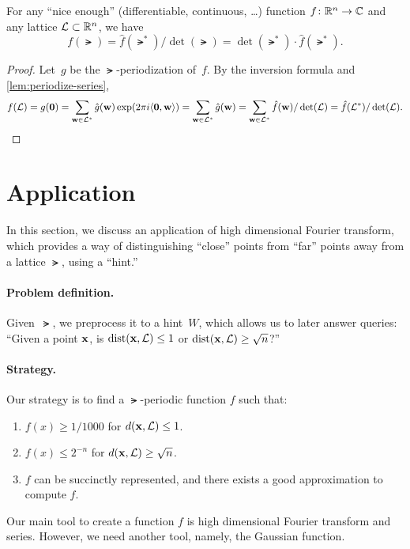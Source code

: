\documentclass[11pt]{article}
\begin{document}
\begin{lemma}
  \label{lem:psf}
  For any ``nice enough'' (differentiable, continuous, \ldots)
  function $f \colon \mathbb{R}^n \to \mathbb{C}$ and any lattice
  $\mathcal{L} \subset \mathbb{R}^{n}$, we have
  \[ f(\lat) = \hat{f}(\lat^{*}) / \det(\lat) = \det(\lat^*) \cdot
    \hat{f}(\lat^*). \]
\end{lemma}

\begin{proof}
  Let~$g$ be the $\lat$-periodization of~$f$. By the inversion formula
  and \cref{lem:periodize-series},
  \[ f(\mathcal{L}) = g(\mathbf{0}) = \sum_{\mathbf{w} \in \mathcal{L}^*}
    \hat{g}(\mathbf{w})\exp(2 \pi i \langle\mathbf{0},\mathbf{w}\rangle) = \sum_{\mathbf{w}
      \in \mathcal{L}^*} \hat{g}(\mathbf{w}) = \sum_{\mathbf{w} \in \mathcal{L}^{*}}
    \hat{f}(\mathbf{w})/\det(\mathcal{L}) = \hat{f}(\mathcal{L}^{*}) / \det(\mathcal{L}). \]
\end{proof}

\section{Application}

In this section, we discuss an application of high dimensional Fourier
transform, which provides a way of distinguishing ``close'' points
from ``far'' points away from a lattice $\lat$, using a ``hint.''

\paragraph{Problem definition.}

Given~$\lat$, we preprocess it to a hint~$W$, which allows us to later
answer queries: ``Given a point $\mathbf{x}$, is $\operatorname{dist}(\mathbf{x},\mathcal{L}) \leq 1$
or $\operatorname{dist}(\mathbf{x},\mathcal{L}) \geq \sqrt{n}$?''

\paragraph{Strategy.}

Our strategy is to find a $\lat$-periodic function $f$ such that:
\begin{enumerate}
\item $f(x) \geq 1/1000$ for $d(\mathbf{x},\mathcal{L})\leq 1$.
\item $f(x) \leq 2^{-n}$ for $d(\mathbf{x},\mathcal{L})\geq \sqrt{n}$.
\item $f$ can be succinctly represented, and there exists a good
  approximation to compute $f$.
\end{enumerate}
Our main tool to create a function $f$ is high dimensional Fourier
transform and series. However, we need another tool, namely, the
Gaussian function.
\end{document}
